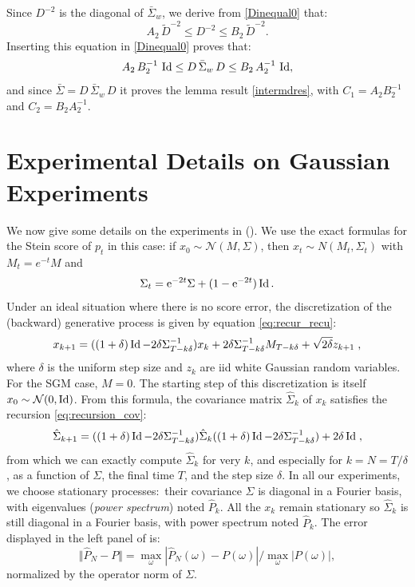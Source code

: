 \documentclass{article}
\begin{document}
Since $D^{-2}$ is the diagonal of $\bar \Sigma_w$, we derive from \eqref{Dinequal0} that:
\begin{equation}
  \label{Dinequal}
A_2\,  \tilde D^{-2} \leq   D^{-2} \leq B_2\,  \tilde D^{-2} .
\end{equation}
Inserting this equation in \eqref{Dinequal0}
proves that:
\[
 A_2\,B_2^{-1}\, \operatorname{Id} \leq D\,\bar \Sigma_w\,D \leq B_2\,A^{-1}_2 \,\operatorname{Id} ,
\]
and since $\bar \Sigma = D\,\bar \Sigma_w\,D$ it proves
the lemma result \eqref{intermdres}, with $C_1 = A_2 B^{-1}_2$ and $C_2 = B_2 A_2^{-1}$. 








\section{Experimental Details on Gaussian Experiments}\label{app:gaussian_exps}


We now give some details on the experiments in  (). We use the exact formulas for the Stein score of $p_t$ in this case: if $x_0 \sim \mathcal{N}(M,\Sigma)$, then $x_t \sim N(M_t, \Sigma_t)$ with $M_t = e^{-t}M$ and
$$ \Sigma_t = \mathrm{e}^{-2t}\Sigma + (1 - \mathrm{e}^{-2t})\operatorname{Id}.$$
Under an ideal situation where there is no score error, the discretization of the (backward) generative process is given by equation \eqref{eq:recur_recu}: 
\begin{equation}
  x_{k+1} = ((1 + \delta) \operatorname{Id} - 2\delta \Sigma_{T - k \delta}^{-1}) x_k  + 2 \delta \Sigma_{T - k \delta}^{-1} M_{T-k \delta}+ \sqrt{2 \delta} z_{k+1} \; ,
\end{equation}
where $\delta$ is the uniform step size and $z_k$ are iid white Gaussian random variables. For the SGM case, $M=0$. The starting step of this discretization is itself $x_0 \sim \mathcal{N}(0,\operatorname{Id})$. From this formula, the covariance matrix $\hat{\Sigma}_k$ of $x_k$ satisfies the recursion \eqref{eq:recursion_cov}: 
\begin{equation}
  \hat{\Sigma}_{k+1} = ((1 + \delta) \operatorname{Id} - 2\delta \Sigma_{T - k \delta}^{-1}) \hat{\Sigma}_k ((1 + \delta) \operatorname{Id} - 2\delta \Sigma_{T - k \delta}^{-1}) + 2 \delta \operatorname{Id} \; ,
\end{equation}
from which we can exactly compute $\hat{\Sigma}_k$ for very $k$, and especially for $k=N=T/\delta$, as a function of $\Sigma$, the final time $T$, and the step size $\delta$. In all our experiments, we choose stationary processes: their covariance $\Sigma$ is diagonal in a Fourier basis, with eigenvalues (\emph{power spectrum}) noted $\hat{P}_k$. All the $x_k$ remain stationary so $\hat{\Sigma}_k$ is still diagonal in a Fourier basis, with power spectrum noted $\hat{P}_k$. The error displayed in the left panel of   is: $$\Vert \hat{P}_N - P\Vert = \max_\omega |\hat{P}_N(\omega) - P(\omega)|/\max_\omega |P(\omega)|,$$ normalized by the operator norm of $\Sigma$. 
\end{document}
